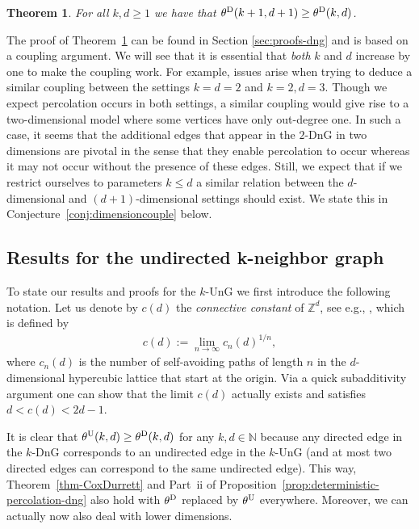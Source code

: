 \documentclass[a4paper, oneside, 11pt]{amsart}
\newcommand{\N}{\mathbb{N}}
\newtheorem{theorem}{Theorem}[section]
\theoremstyle{definition}
\newcommand{\1}{\mathbbm{1}}
\newcommand{\0}{\mathbf{o}}
\newcommand{\Z}{\mathbb{Z}}
\numberwithin{equation}{section}
\begin{document}
\begin{theorem}\label{theorem-3322}
For all $k,d\ge1$ we have that $\theta^{\rm D}(k+1,d+1)\ge \theta^{\rm D}(k,d)$.
\end{theorem}

The proof of Theorem~\ref{theorem-3322} can be found in Section \ref{sec:proofs-dng} and is based on a coupling argument. We will see that it is essential that \emph{both} $k$ and $d$ increase by one to make the coupling work. For example, issues arise when trying to deduce a similar coupling between the settings $k=d=2$ and $k=2,d=3$. Though we expect percolation occurs in both settings, a similar coupling would give rise to a two-dimensional model where some vertices have only out-degree one. In such a case, it seems that the additional edges that appear in the $2$-DnG in two dimensions are pivotal in the sense that they enable percolation to occur whereas it may not occur without the presence of these edges. 
Still, we expect that if we restrict ourselves to parameters $k \leq d$ a similar relation between the $d$-dimensional and $(d+1)$-dimensional settings should exist. We state this in Conjecture~\ref{conj:dimensioncouple} below.

\subsection{Results for the undirected k-neighbor graph}

To state our results and proofs for the $k$-UnG we first introduce the following notation. Let us denote by $c(d)$ the \textit{connective constant} of $\Z^d$, see e.g., \cite{grimmett2006random}, which is defined by 
\begin{align*}
    c(d) := \lim_{n \to \infty}c_n(d)^{1/n},
\end{align*}
where $c_n(d)$ is the number of self-avoiding paths of length $n$ in the $d$-dimensional hypercubic lattice that start at the origin. Via a quick subadditivity argument one can show that the limit $c(d)$ actually exists and satisfies $d < c(d) < 2d -1$. 

It is clear that $\theta^{\rm U}(k,d) \geq \theta^{\rm D}(k,d)$ for any $k,d\in \N$ because any directed edge in the $k$-DnG corresponds to an undirected edge in the $k$-UnG (and at most two directed edges can correspond to the same undirected edge). This way, Theorem~\ref{thm-CoxDurrett} and Part~ii of Proposition~\ref{prop:deterministic-percolation-dng} also hold with $\theta^{\rm D}$ replaced by $\theta^{\rm U}$ everywhere. Moreover, we can actually now also deal with lower dimensions. 
\end{document}
